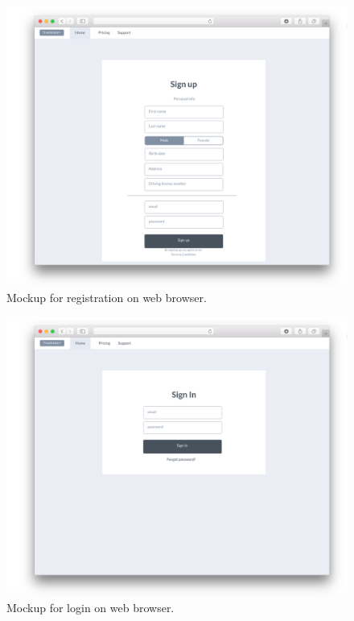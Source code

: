 \documentclass{article}
\begin{document}
	\bigskip
	\begin{figure}[!ht]
	\centering
	\includegraphics[height=0.5\textheight]{img/mockups/web/register.png}
	\caption{Mockup for registration on web browser.}
	\end{figure}
	\clearpage

	\begin{figure}[!ht]
	\centering
	\includegraphics[height=0.4\textheight]{img/mockups/web/login.png}
	\caption{Mockup for login on web browser.}
	\end{figure}
\end{document}
